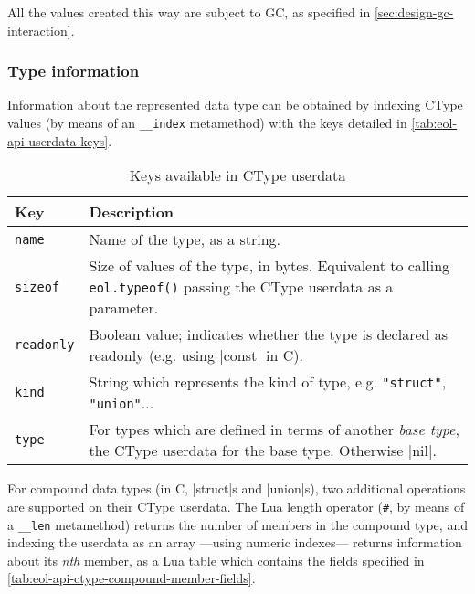 All the values created this way are subject to \gls{GC}, as specified in
\autoref{sec:design-gc-interaction}.


\subsubsection{Type information}

Information about the represented data type can be obtained by indexing
\textsf{CType} values (by means of an \texttt{\_\_index} metamethod) with the
keys detailed in \autoref{tab:eol-api-userdata-keys}.

\begin{table}[ht]
	\centering
	\begin{tabular}{lp{}}
		\toprule
		Key & Description \\
		\midrule
		\texttt{name} & Name of the type, as a string. \\
		\texttt{sizeof} & Size of values of the type, in bytes. Equivalent to
			calling \texttt{eol.typeof()} passing the \textsf{CType} userdata as
			a parameter. \\
		\texttt{readonly} & Boolean value; indicates whether the type is
			declared as readonly (e.g. using \Mc|const| in C). \\
		\texttt{kind} & String which represents the kind of type, e.g.
			\texttt{"struct"}, \texttt{"union"}... \\
		\texttt{type} & For types which are defined in terms of another
			\emph{base type}, the \textsf{CType} userdata for the base type.
			Otherwise \Mlua|nil|. \\
		\bottomrule
	\end{tabular}
	\caption{Keys available in \textsf{CType} userdata}
	\label{tab:eol-api-userdata-keys}
\end{table}

For compound data types (in C, \Mc|struct|s and \Mc|union|s), two additional
operations are supported on their \textsf{CType} userdata. The Lua length
operator (\texttt\#, by means of a \texttt{\_\_len} metamethod) returns the
number of members in the compound type, and indexing the userdata as an array
—using numeric indexes— returns information about its \emph{nth} member, as
a Lua table which contains the fields specified in
\autoref{tab:eol-api-ctype-compound-member-fields}.

